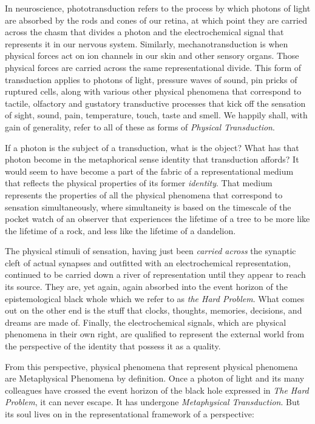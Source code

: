 \documentclass[runningheads]{llncs}
\begin{document}
In neuroscience, phototransduction refers to the process by which photons of light are absorbed by the rods and cones of our retina, at which point they are carried across the chasm that divides a photon and the electrochemical signal that represents it in our nervous system. Similarly, mechanotransduction is when physical forces act on ion channels in our skin and other sensory organs. Those physical forces are carried across the same representational divide. This form of transduction applies to photons of light, pressure waves of sound, pin pricks of ruptured cells, along with various other physical phenomena that correspond to tactile, olfactory and gustatory transductive processes that kick off the sensation of sight, sound, pain, temperature, touch, taste and smell. We happily shall, with gain of generality, refer to all of these as forms of \emph{Physical Transduction}.

If a photon is the subject of a transduction, what is the object? What has that photon become in the metaphorical sense identity that transduction affords? It would seem to have become a part of the fabric of a representational medium that reflects the physical properties of its former \emph{identity}. That medium represents the properties of all the physical phenomena that correspond to sensation simultaneously, where simultaneity is based on the timescale of the pocket watch of an observer that experiences the lifetime of a tree to be more like the lifetime of a rock, and less like the lifetime of a dandelion.

The physical stimuli of sensation, having just been \emph{carried across} the synaptic cleft of actual synapses and outfitted with an electrochemical representation, continued to be carried down a river of representation until they appear to reach its source. They are, yet again, again absorbed into the event horizon of the epistemological black whole which we refer to as \emph{the Hard Problem}. What comes out on the other end is the stuff that clocks, thoughts, memories, decisions, and dreams are made of. Finally, the electrochemical signals, which are physical phenomena in their own right, are qualified to represent the external world from the perspective of the identity that possess it as a quality. 

From this perspective, physical phenomena that represent physical phenomena are Metaphysical Phenomena by definition. Once a photon of light and its many colleagues have crossed the event horizon of the black hole expressed in \emph{The Hard Problem}, it can never escape. It has undergone \emph{Metaphysical Transduction}. But its soul lives on in the representational framework of a perspective: 
\end{document}
